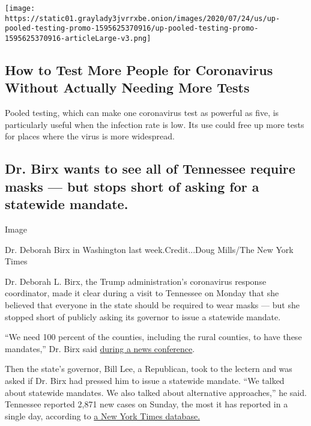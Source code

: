 \texttt{[image: https://static01.graylady3jvrrxbe.onion/images/2020/07/24/us/up-pooled-testing-promo-1595625370916/up-pooled-testing-promo-1595625370916-articleLarge-v3.png]}

\hypertarget{how-to-test-more-people-for-coronavirus-without-actually-needing-more-tests}{%
\subsection{How to Test More People for Coronavirus Without Actually
Needing More
Tests}\label{how-to-test-more-people-for-coronavirus-without-actually-needing-more-tests}}

Pooled testing, which can make one coronavirus test as powerful as five,
is particularly useful when the infection rate is low. Its use could
free up more tests for places where the virus is more widespread.

\hypertarget{dr-birx-wants-to-see-all-of-tennessee-require-masks--but-stops-short-of-asking-for-a-statewide-mandate}{%
\subsection{Dr. Birx wants to see all of Tennessee require masks --- but
stops short of asking for a statewide
mandate.}\label{dr-birx-wants-to-see-all-of-tennessee-require-masks--but-stops-short-of-asking-for-a-statewide-mandate}}

Image

Dr. Deborah Birx in Washington last week.Credit...Doug Mills/The New
York Times

Dr. Deborah L. Birx, the Trump administration's coronavirus response
coordinator, made it clear during a visit to Tennessee on Monday that
she believed that everyone in the state should be required to wear masks
--- but she stopped short of publicly asking its governor to issue a
statewide mandate.

``We need 100 percent of the counties, including the rural counties, to
have these mandates,'' Dr. Birx said
\href{https://www.youtube.com/watch?v=y1UBeX0x-I8}{during a news
conference}.

Then the state's governor, Bill Lee, a Republican, took to the lectern
and was asked if Dr. Birx had pressed him to issue a statewide mandate.
``We talked about statewide mandates. We also talked about alternative
approaches,'' he said. Tennessee reported 2,871 new cases on Sunday, the
most it has reported in a single day, according to
\href{https://www.nytimes3xbfgragh.onion/interactive/2020/us/tennessee-coronavirus-cases.html}{a
New York Times database.}

